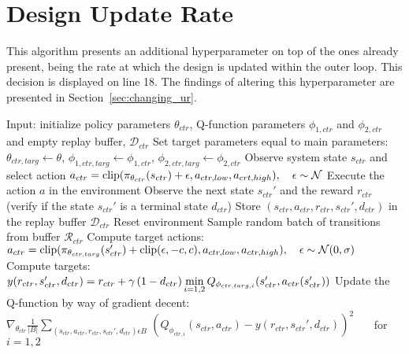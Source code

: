 \section{Design Update Rate}
This algorithm presents an additional hyperparameter on top of the ones already present, being the rate at which the design is updated within the outer loop. This decision is displayed on line 18. The findings of altering this hyperparameter are presented in Section~\ref{sec:changing_ur}.

\begin{algorithmic}[1]
    \State Input: initialize policy parameters $\theta_{ctr}$, Q-function parameters $\phi_{1,ctr}$ and $\phi_{2,ctr}$ and empty replay buffer, $\mathcal{D}_{ctr}$
    \State Set target parameters equal to main parameters: $\theta_{ctr,targ} \leftarrow \theta$, $\phi_{1,ctr,targ} \leftarrow \phi_{1,ctr}$, $\phi_{2,ctr,targ} \leftarrow \phi_{2,ctr}$
    \State Observe system state $s_{ctr}$ and select action $a_{ctr} = \textup{clip}(\pi_{\theta_{ctr}}(s_{ctr}) + \epsilon, a_{ctr,low}, a_{crt,high}),~~~ \epsilon \sim \mathcal{N}$
    \State Execute the action $a$ in the environment
    \State Observe the next state $s_{ctr}'$ and the reward $r_{ctr}$ (verify if the state $s_{ctr}'$ is a terminal state $d_{ctr}$)
    \State Store $(s_{ctr}, a_{ctr}, r_{ctr}, s_{ctr}', d_{ctr})$ in the replay buffer $\mathcal{D}_{ctr}$
    \State Reset environment
    \EndIf
    \State Sample random batch of transitions from buffer $\mathcal{R}_{ctr}$
    \State Compute target actions: \newline \hspace*{5em} $a_{ctr} = \textup{clip}(\pi_{\theta_{ctr,targ}}(s_{ctr}') + \textup{clip}(\epsilon, -c, c), a_{ctr,low}, a_{ctr,high}),~~~ \epsilon \sim \mathcal{N}(0,\sigma)$
    \State Compute targets: \newline \hspace*{5em} $y(r_{ctr},s_{ctr}',d_{ctr}) = r_{ctr} + \gamma\,(1-d_{ctr})\, \underset{i=1,2}{\textup{min}}\, Q_{\phi_{ctr,targ,i}}(s_{ctr}', a_{ctr}(s_{ctr}'))$
    \State Update the Q-function by way of gradient decent: \newline \hspace*{5em} $\nabla_{\theta_{ctr}}\frac{1}{|B|}\sum_{(s_{ctr},a_{ctr},r_{ctr},s_{ctr}',d_{ctr}) \epsilon B} \, (Q_{\phi_{ctr,i}}(s_{ctr}, a_{ctr}) - y(r_{ctr},s_{ctr}',d_{ctr}))^2$~~~ for $i=1,2$


\end{algorithmic}

